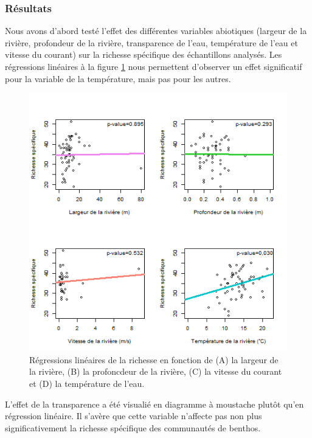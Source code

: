 \documentclass[9pt,twocolumn,twoside,]{pnas-new}
\begin{document}
\hypertarget{ruxe9sultats}{%
\subsubsection*{Résultats}\label{ruxe9sultats}}

Nous avons d'abord testé l'effet des différentes variables abiotiques
(largeur de la rivière, profondeur de la rivière, transparence de l'eau,
température de l'eau et vitesse du courant) sur la richesse spécifique
des échantillons analysés. Les régressions linéaires à la figure
\ref{fig:regression_richesse} nous permettent d'observer un effet
significatif pour la variable de la température, mais pas pour les
autres.

\begin{figure}
\centering
\includegraphics{regression_richesse.png}
\caption{Régressions linéaires de la richesse en fonction de (A) la
largeur de la rivière, (B) la profoncdeur de la rivière, (C) la vitesse
du courant et (D) la température de l'eau.
\label{fig:regression_richesse}}
\end{figure}

L'effet de la transparence a été visualié en diagramme à moustache
plutôt qu'en régression linéaire. Il s'avère que cette variable
n'affecte pas non plus significativement la richesse spécifique des
communautés de benthos.
\end{document}
